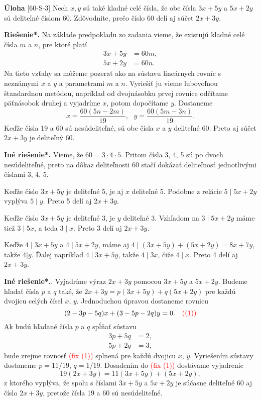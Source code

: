 \documentclass{article}
\newcommand{\rieh}{\textbf{Riešenie*.} }
\newcommand\todo[1]{\noindent\textcolor{red}{(#1)}}
\newcommand{\problem}[4]{
  \begin{tcolorbox}[breakable,notitle,boxrule=0pt,colback=light-gray,colframe=light-gray]
    \textbf{Úloha}
    [#1] #3
  \end{tcolorbox}
  \noindent#4
}
\begin{document}
\problem{60-S-3}{}{
Nech $x, y$ sú také kladné celé čísla, že obe čísla $3x + 5y$ a $5x + 2y$ sú deliteľné číslom 60. Zdôvodnite, prečo číslo 60 delí aj súčet $2x + 3y$.
}{
\rieh Na základe predpokladu zo zadania vieme, že existujú kladné celé čísla $m$ a $n$, pre ktoré platí
\begin{align*}
3x + 5y &= 60m,\\
5x + 2y &= 60n.
\end{align*}
Na tieto vzťahy sa môžeme pozerať ako na sústavu lineárnych rovníc s neznámymi $x$ a $y$ a parametrami $m$ a $n$. Vyriešiť ju vieme ľubovoľnou štandardnou metódou, napríklad od dvojnásobku prvej rovnice odčítame päťnásobok druhej a vyjadríme $x$, potom dopočítame $y$. Dostaneme
$$x = \frac{60(5n - 2m)}{19}, \ \ \ y =\frac{60(5m - 3n)}{19}.$$
Keďže čísla 19 a 60 sú nesúdeliteľné, sú obe čísla $x$ a $y$ deliteľné 60. Preto aj súčet $2x + 3y$ je deliteľný 60.

\textbf{Iné riešenie*.} Vieme, že $60 = 3 \cdot 4 \cdot 5$. Pritom čísla 3, 4, 5 sú po dvoch nesúdeliteľné, preto na dôkaz deliteľnosti 60 stačí dokázať deliteľnosť jednotlivými číslami 3, 4, 5.

Keďže číslo $3x + 5y$ je deliteľné $5$, je aj $x$ deliteľné 5. Podobne z relácie $5 \mid 5x + 2y$ vyplýva $5 \mid y$. Preto 5 delí aj $2x + 3y$.

Keďže číslo $3x + 5y$ je deliteľné 3, je $y$ deliteľné 3. Vzhľadom na $3 \mid 5x + 2y$ máme tiež $3 \mid 5x$, a teda $3 \mid x$. Preto 3 delí aj $2x + 3y$.

Keďže $4 \mid 3x + 5y$ a $4 \mid 5x + 2y$, máme aj $4 \mid (3x + 5y) + (5x + 2y) = 8x + 7y$, takže $4 | y$. Ďalej napríklad $4 \mid 3x + 5y$, takže $4 \mid 3x$, čiže $4 \mid x$. Preto 4 delí aj $2x + 3y$.

\textbf{Iné riešenie*.}. Vyjadríme výraz $2x + 3y$ pomocou $3x + 5y$ a $5x + 2y$. Budeme hľadať čísla $p$ a $q$ také, že $2x + 3y = p(3x + 5y) + q(5x + 2y)$ pre každú dvojicu celých čísel $x$, $y$. Jednoduchou úpravou dostaneme rovnicu
$$(2 - 3p - 5q)x + (3 - 5p - 2q)y = 0. \ \ \ \todo{(1)}$$
Ak budú hľadané čísla $p$ a $q$ spĺňať sústavu
\begin{align*}
3p + 5q &= 2,\\
5p + 2q &= 3,
\end{align*}
bude zrejme rovnosť \todo{fix (1)} splnená pre každú dvojicu $x$, $y$. Vyriešením sústavy dostaneme $p = 11/19$, $q = 1/19$. Dosadením do \todo{fix (1)} dostávame vyjadrenie
$$19(2x + 3y) = 11(3x + 5y) + (5x + 2y),$$
z ktorého vyplýva, že spolu s číslami $3x + 5y$ a $5x + 2y$ je súčasne deliteľné 60 aj číslo $2x + 3y$, pretože čísla 19 a 60 sú nesúdeliteľné.
}
\end{document}
